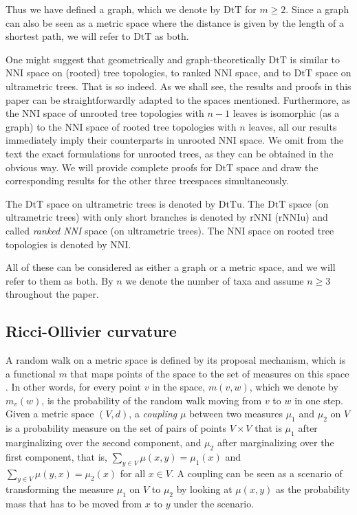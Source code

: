 \documentclass{amsart}
\theoremstyle{definition}
\newcommand{\nni}{\mathrm{NNI}}
\newcommand{\rnni}{\mathrm{rNNI}}
\newcommand{\rnniu}{\mathrm{rNNIu}}
\newcommand{\mdts}{\mathrm{DtT}}
\newcommand{\mdtsu}{\mathrm{DtTu}}
\begin{document}
Thus we have defined a graph, which we denote by $\mdts$ for $m \geq 2$.
Since a graph can also be seen as a metric space where the distance is given by the length of a shortest path, we will refer to $\mdts$ as both.

One might suggest that geometrically and graph-theoretically $\mdts$ is similar to NNI space on (rooted) tree topologies, to ranked NNI space, and to $\mdts$ space on ultrametric trees.
That is so indeed.
As we shall see, the results and proofs in this paper can be straightforwardly adapted to the spaces mentioned.
Furthermore, as the NNI space of unrooted tree topologies with $n-1$ leaves is isomorphic (as a graph) to the NNI space of rooted tree topologies with $n$ leaves, all our results immediately imply their counterparts in unrooted NNI space.
We omit from the text the exact formulations for unrooted trees, as they can be obtained in the obvious way.
We will provide complete proofs for $\mdts$ space and draw the corresponding results for the other three treespaces simultaneously.

The $\mdts$ space on ultrametric trees is denoted by $\mdtsu$.
The $\mdts$ space (on ultrametric trees) with only short branches is denoted by $\rnni$ ($\rnniu$) and called {\em ranked NNI} space (on ultrametric trees).
The $\nni$ space on rooted tree topologies is denoted by $\nni$.

All of these can be considered as either a graph or a metric space, and we will refer to them as both.
By $n$ we denote the number of taxa and assume $n \geq 3$ throughout the paper.


\subsection{Ricci-Ollivier curvature}
A random walk on a metric space is defined by its proposal mechanism, which is a functional $m$ that maps points of the space to the set of measures on this space \autocite[see][]{Ollivier2009-cj}.
In other words, for every point $v$ in the space, $m(v,w)$, which we denote by $m_v(w)$, is the probability of the random walk moving from $v$ to $w$ in one step.
Given a metric space $(V,d)$, a \emph{coupling} $\mu$ between two measures $\mu_1$ and $\mu_2$ on $V$ is a probability measure on the set of pairs of points $V \times V$ that is $\mu_1$ after marginalizing over the second component, and $\mu_2$ after marginalizing over the first component, that is, $\sum\limits_{y \in V}\mu(x,y) = \mu_1(x)$ and $\sum\limits_{y \in V}\mu(y,x) = \mu_2(x)$ for all $x \in V$.
A coupling can be seen as a scenario of transforming the measure $\mu_1$ on $V$ to $\mu_2$ by looking at $\mu(x,y)$ as the probability mass that has to be moved from $x$ to $y$ under the scenario.
\end{document}
